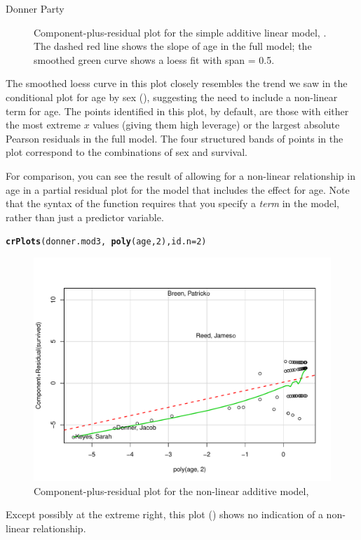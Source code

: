 \documentclass[11pt]{book}\usepackage[]{graphicx}\usepackage[]{color}
\makeatletter
\newcommand{\hlnum}[1]{\textcolor[rgb]{0.686,0.059,0.569}{#1}}%
\newcommand{\hlopt}[1]{\textcolor[rgb]{0,0,0}{#1}}%
\newcommand{\hlstd}[1]{\textcolor[rgb]{0.345,0.345,0.345}{#1}}%
\newcommand{\hlkwc}[1]{\textcolor[rgb]{0.333,0.667,0.333}{#1}}%
\newcommand{\hlkwd}[1]{\textcolor[rgb]{0.737,0.353,0.396}{\textbf{#1}}}%
\newenvironment{kframe}{%
 \def\at@end@of@kframe{}%
 \ifinner\ifhmode%
  \def\at@end@of@kframe{\end{minipage}}%
  \begin{minipage}{\columnwidth}%
 \fi\fi%
 \def\FrameCommand##1{\hskip\@totalleftmargin \hskip-\fboxsep
 \colorbox{shadecolor}{##1}\hskip-\fboxsep
     \hskip-\linewidth \hskip-\@totalleftmargin \hskip\columnwidth}%
 \MakeFramed {\advance\hsize-\width
   \@totalleftmargin\z@ \linewidth\hsize
   \@setminipage}}%
 {\par\unskip\endMakeFramed%
 \at@end@of@kframe}
\newenvironment{knitrout}{}{} %
\renewenvironment{knitrout}{\small\renewcommand{\baselinestretch}{.85}}{} %
\makeatother
\begin{document}
\begin{Example}[donner3]{Donner Party}
\begin{knitrout}
\begin{figure}[!htbp]
\caption[Component-plus-residual plot for the simple additive linear model]{Component-plus-residual plot for the simple additive linear model, . The dashed red line shows the slope of age in the full model; the smoothed green curve shows a loess fit with span = 0.5.\label{fig:donner-cr1}}
\end{figure}


\end{knitrout}
The smoothed loess curve in this plot closely resembles the trend we saw in the conditional
plot for age by sex (), suggesting the need to include a non-linear
term for age.  The points identified in this plot, by default, are those with either the most extreme
$x$ values (giving them high leverage) or the largest absolute Pearson residuals
in the full model. The four structured bands of points in the plot correspond to the combinations
of sex and survival.

For comparison, you can see the result of allowing for a non-linear relationship in
age in a partial residual plot for the model  that includes the
effect  for age. Note that the syntax of the  function 
requires that you specify a \emph{term} in the model, rather than just a predictor variable. 
\begin{knitrout}
\color{fgcolor}\begin{kframe}
\begin{alltt}
\hlkwd{crPlots}\hlstd{(donner.mod3,} \hlopt{~}\hlkwd{poly}\hlstd{(age,}\hlnum{2}\hlstd{),} \hlkwc{id.n}\hlstd{=}\hlnum{2}\hlstd{)}
\end{alltt}
\end{kframe}\begin{figure}[!htbp]


\centerline{\includegraphics[width=.6\textwidth]{ch07/fig/donner-cr2-1} }

\caption[Component-plus-residual plot for the non-linear additive  model]{Component-plus-residual plot for the non-linear additive  model, \label{fig:donner-cr2}}
\end{figure}


\end{knitrout}
Except possibly at the extreme right, this plot () shows no indication of a non-linear relationship.

\end{Example}
\end{document}
